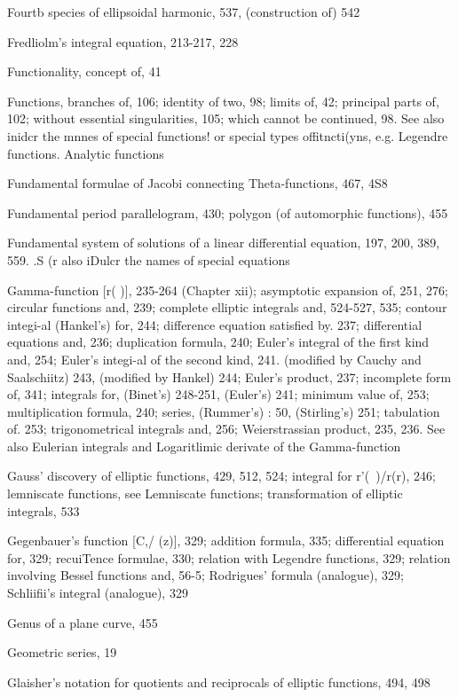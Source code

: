 Fourtb species of ellipsoidal harmonic, 537, (construction of) 542

Fredliolm's integral equation, 213-217, 228

Functionality, concept of, 41

Functions, branches of, 106; identity of two, 98; limits of, 42; principal parts of, 102; without
essential singularities, 105; which cannot be continued, 98. See also inidcr the mnnes of
special functions! or special types offitncti(yns, e.g. Legendre functions. Analytic functions

Fundamental formulae of Jacobi connecting Theta-functions, 467, 4S8

Fundamental period parallelogram, 430; polygon (of automorphic functions), 455

Fundamental system of solutions of a linear differential equation, 197, 200, 389, 559. .S (r also
iDulcr the names of special equations

Gamma-function [r( )], 235-264 (Chapter xii); asymptotic expansion of, 251, 276; circular
functions and, 239; complete elliptic integrals and, 524-527, 535; contour integi-al (Hankel's)
for, 244; difference equation satisfied by. 237; differential equations and, 236; duplication
formula, 240; Euler's integral of the first kind and, 254; Euler's integi-al of the second
kind, 241. (modified by Cauchy and Saalschiitz) 243, (modified by Hankel) 244; Euler's
product, 237; incomplete form of, 341; integrals for, (Binet's) 248-251, (Euler's) 241;
minimum value of, 253; multiplication formula, 240; series, (Rummer's) : 50, (Stirling's)
251; tabulation of. 253; trigonometrical integrals and, 256; Weierstrassian product, 235,
236. See also Eulerian integrals and Logaritlimic derivate of the Gamma-function

Gauss' discovery of elliptic functions, 429, 512, 524; integral for r'(~)/r(r), 246; lemniscate
functions, see Lemniscate functions; transformation of elliptic integrals, 533

Gegenbauer's function [C,/ (z)], 329; addition formula, 335; differential equation for, 329;
recuiTence formulae, 330; relation with Legendre functions, 329; relation involving Bessel
functions and, 56-5; Rodrigues' formula (analogue), 329; Schliifii's integral (analogue), 329

Genus of a plane curve, 455

Geometric series, 19

Glaisher's notation for quotients and reciprocals of elliptic functions, 494, 498

